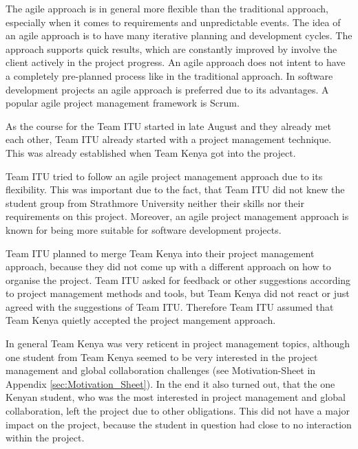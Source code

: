 
The agile approach is in general more flexible than the traditional approach, especially when it comes to requirements and unpredictable events. The idea of an agile approach is to have many iterative planning and development cycles. The approach supports quick results, which are constantly improved by involve the client actively in the project progress. An agile approach does not intent to have a completely pre-planned process like in the traditional approach. In software development projects an agile approach is preferred due to its advantages. A popular agile project management framework is Scrum\cite{scrum}.

As the course for the Team ITU started in late August and they already met each other, Team ITU already started with a project management technique. This was already established when Team Kenya got into the project.

Team ITU tried to follow an agile project management approach due to its flexibility. This was important due to the fact, that Team ITU did not knew the student group from Strathmore University neither their skills nor their requirements on this project. Moreover, an agile project management approach is known for being more suitable for software development projects\cite{project_management_approches}.

Team ITU planned to merge Team Kenya into their project management approach, because they did not come up with a different approach on how to organise the project. Team ITU asked for feedback or other suggestions according to project management methods and tools, but Team Kenya did not react or just agreed with the suggestions of Team ITU. Therefore Team ITU assumed that Team Kenya quietly accepted the project mangement approach.

In general Team Kenya was very reticent in project management topics, although one student from Team Kenya seemed to be very interested in the project management and global collaboration challenges (see Motivation-Sheet in Appendix \ref{sec:Motivation_Sheet}). In the end it also turned out, that the one Kenyan student, who was the most interested in project management and global collaboration, left the project due to other obligations. This did not have a major impact on the project, because the student in question had close to no interaction within the project.

